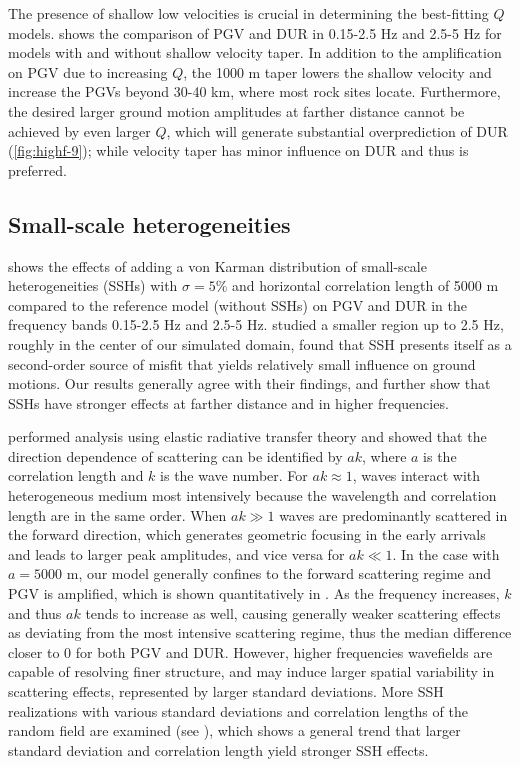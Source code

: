 The presence of shallow low velocities is crucial in determining the best-fitting $Q$ models.  shows the comparison of PGV and DUR in 0.15-2.5 Hz and 2.5-5 Hz for models with and without shallow velocity taper. In addition to the amplification on PGV due to increasing $Q$, the 1000 m taper lowers the shallow velocity and increase the PGVs beyond 30-40 km, where most rock sites locate. Furthermore, the desired larger ground motion amplitudes at farther distance cannot be achieved by even larger $Q$, which will generate substantial overprediction of DUR (\cref{fig:highf-9}); while velocity taper has minor influence on DUR and thus is preferred.

\subsection{Small-scale heterogeneities}
 shows the effects of adding a von Karman distribution of small-scale heterogeneities (SSHs) with $\sigma = 5\%$ and horizontal correlation length of 5000 m compared to the reference model (without SSHs) on PGV and DUR in the frequency bands 0.15-2.5 Hz and 2.5-5 Hz. \citet{savranGroundMotionSimulation2019} studied a smaller region up to 2.5 Hz, roughly in the center of our simulated domain, found that SSH presents itself as a second-order source of misfit that yields relatively small influence on ground motions. Our results generally agree with their findings, and further show that SSHs have stronger effects at farther distance and in higher frequencies.

\citet{przybillaEstimationCrustalScattering2009} performed analysis using elastic radiative transfer theory and showed that the direction dependence of scattering can be identified by $ak$, where $a$ is the correlation length and $k$ is the wave number. For $ak \approx 1$, waves interact with heterogeneous medium most intensively because the wavelength and correlation length are in the same order. When $ak\gg 1$ waves are predominantly scattered in the forward direction, which generates geometric focusing in the early arrivals and leads to larger peak amplitudes, and vice versa for $ak \ll 1$. In the case with $a=5000$ m, our model generally confines to the forward scattering regime and PGV is amplified, which is shown quantitatively in . As the frequency increases, $k$ and thus $ak$ tends to increase as well, causing generally weaker scattering effects as deviating from the most intensive scattering regime, thus the median difference closer to 0 for both PGV and DUR. However, higher frequencies wavefields are capable of resolving finer structure, and may induce larger spatial variability in scattering effects, represented by larger standard deviations. More SSH realizations with various standard deviations and correlation lengths of the random field are examined (see ), which shows a general trend that larger standard deviation and correlation length yield stronger SSH effects.


